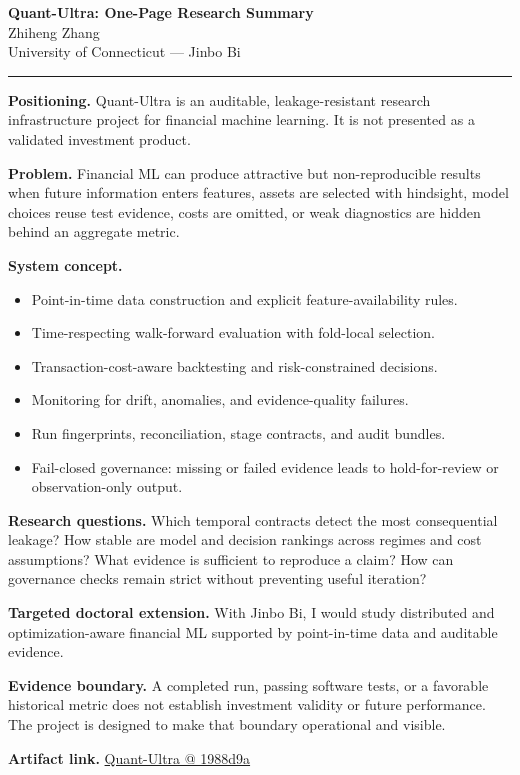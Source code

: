 \documentclass[11pt]{article}
\makeatletter
\newcommand{\ApplicantName}{Zhiheng Zhang}
\newcommand{\ApplicantGitHub}{\href{https://github.com/zhiheng-zhang-Mera/Quant-Ultra/tree/1988d9a8530da91a8158de864d098ea869098923}{Quant-Ultra @ 1988d9a}}
\makeatother
\begin{document}
\begin{center}
{\LARGE\bfseries Quant-Ultra: One-Page Research Summary}\\[0.25em]
{\large \ApplicantName}\\
University of Connecticut --- Jinbo Bi
\end{center}
\vspace{0.35em}\hrule\vspace{0.65em}

\textbf{Positioning.} Quant-Ultra is an auditable, leakage-resistant research infrastructure project for financial machine learning. It is not presented as a validated investment product.

\textbf{Problem.} Financial ML can produce attractive but non-reproducible results when future information enters features, assets are selected with hindsight, model choices reuse test evidence, costs are omitted, or weak diagnostics are hidden behind an aggregate metric.

\textbf{System concept.}
\begin{itemize}
\item Point-in-time data construction and explicit feature-availability rules.
\item Time-respecting walk-forward evaluation with fold-local selection.
\item Transaction-cost-aware backtesting and risk-constrained decisions.
\item Monitoring for drift, anomalies, and evidence-quality failures.
\item Run fingerprints, reconciliation, stage contracts, and audit bundles.
\item Fail-closed governance: missing or failed evidence leads to hold-for-review or observation-only output.
\end{itemize}

\textbf{Research questions.} Which temporal contracts detect the most consequential leakage? How stable are model and decision rankings across regimes and cost assumptions? What evidence is sufficient to reproduce a claim? How can governance checks remain strict without preventing useful iteration?

\textbf{Targeted doctoral extension.} With Jinbo Bi, I would study distributed and optimization-aware financial ML supported by point-in-time data and auditable evidence.

\textbf{Evidence boundary.} A completed run, passing software tests, or a favorable historical metric does not establish investment validity or future performance. The project is designed to make that boundary operational and visible.

\textbf{Artifact link.} \ApplicantGitHub
\end{document}
